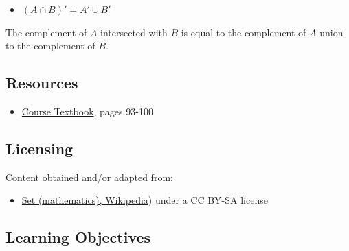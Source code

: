 \begin{itemize}
    \item $ (A \cap B)' = A' \cup B'$
\end{itemize}

The complement of $A$ intersected with $B$ is equal to the complement of $A$ union to the
complement of $B$.




\subsection{Resources}
\label{sss:reso-55b5}




\begin{itemize}
    \item \href{https://link-springer-com.libweb.lib.utsa.edu/content/pdf/10.1007\%2F978-1-4419-7127-2.pdf}{Course Textbook}, pages 93-100
\end{itemize}


\subsection{Licensing}
\label{sss:lice-7352}




Content obtained and/or adapted from:



\begin{itemize}
    \item \href{https://en.wikipedia.org/wiki/Set_(mathematics}{Set (mathematics), Wikipedia}) under a CC BY-SA license
\end{itemize}


\subsection{Learning Objectives}
\label{ssec:lear-fe6e}


